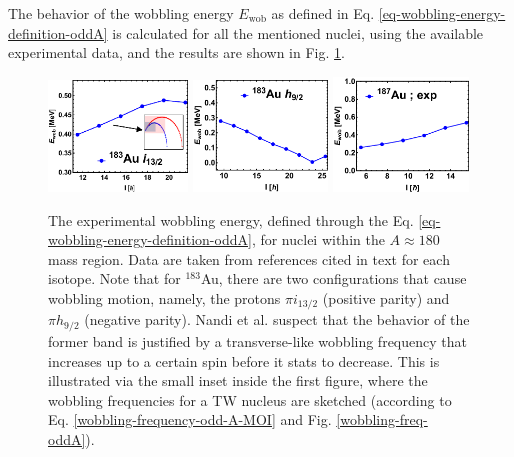 The behavior of the wobbling energy $E_\text{wob}$ as defined in Eq. \ref{eq-wobbling-energy-definition-oddA} is calculated for all the mentioned nuclei, using the available experimental data, and the results are shown in Fig. \ref{wobblers-exp-set4}.
\begin{figure}
    \centering
    \includegraphics[width=0.33\textwidth]{Chapters/Figures/wobblers/183Au_2-edited.pdf}
    \includegraphics[width=0.32\textwidth]{Chapters/Figures/wobblers/183Au_1.pdf}
    \includegraphics[width=0.32\textwidth]{Chapters/Figures/wobblers/187Au.pdf}
    \caption{The experimental wobbling energy, defined through the Eq. \ref{eq-wobbling-energy-definition-oddA}, for nuclei within the $A\approx 180$ mass region. Data are taken from references cited in text for each isotope. Note that for $^{183}$Au, there are two configurations that cause wobbling motion, namely, the protons $\pi i_{13/2}$ (positive parity) and $\pi h_{9/2}$ (negative parity). Nandi et al. \cite{nandi2020first} suspect that the behavior of the former band is justified by a transverse-like wobbling frequency that increases up to a certain spin before it stats to decrease. This is illustrated via the small inset inside the first figure, where the wobbling frequencies for a TW nucleus are sketched (according to Eq. \ref{wobbling-frequency-odd-A-MOI} and Fig. \ref{wobbling-freq-oddA}).}
    \label{wobblers-exp-set4}
\end{figure}

